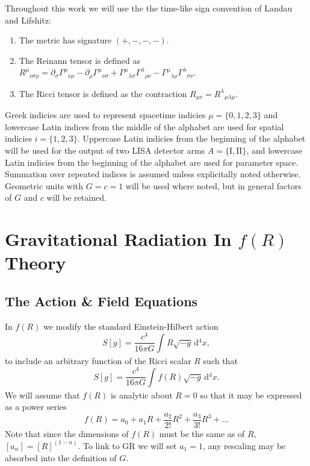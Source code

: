 \documentclass[a4paper, 11pt, titlepage, twoside]{report}
\newcommand{\dd}{\ensuremath{\mathrm{d}}}
\newcommand{\intd}[4]{\ensuremath{\int_{#1}^{#2}{#3}\,\dd{#4}}}
\begin{document}
Throughout this work we will use the the time-like sign convention of Landau and Lifshitz\cite{Landau1975}:
\begin{enumerate}
\item The metric has signature $(+,-,-,-)$.
\item The Reinann tensor is defined as ${R^\mu}_{\nu\sigma\rho} = \partial_\sigma {\Gamma^\mu}_{\nu\rho} - \partial_\rho {\Gamma^\mu}_{\nu\sigma} + {\Gamma^\mu}_{\lambda\sigma}{\Gamma^\lambda}_{\rho\nu} - {\Gamma^\mu}_{\lambda\rho}{\Gamma^\lambda}_{\sigma\nu}$.
\item The Ricci tensor is defined as the contraction $R_{\mu\nu} = {R^\lambda}_{\mu\lambda\mu}$.
\end{enumerate}
Greek indicies are used to represent spacetime indicies $\mu = \{0,1,2,3\}$ and lowercase Latin indices from the middle of the alphabet are used for spatial indicies $i = \{1,2,3\}$. Uppercase Latin indicies from the beginning of the alphabet will be used for the output of two LISA detector arms $A = \{\mathrm{I}, \mathrm{II}\}$, and lowercase Latin indicies from the beginning of the alphabet are used for parameter space. Summation over repeated indices is assumed unless explicitally noted otherwise. Geometric units with $G = c = 1$ will be used where noted, but in general factors of $G$ and $c$ will be retained.

\chapter{Gravitational Radiation In $f(R)$ Theory}

\section{The Action \& Field Equations}

In $f(R)$ we modify the standard Einstein-Hilbert action
\begin{equation}
S[g] = \frac{c^4}{16\pi G}\intd{}{}{R\sqrt{-g}}{^4x},
\end{equation}
to include an arbitrary function of the Ricci scalar $R$ such that
\begin{equation}
S[g] = \frac{c^4}{16\pi G}\intd{}{}{f(R)\sqrt{-g}}{^4x}.
\end{equation}
We will assume that $f(R)$ is analytic about $R = 0$ so that it may be expressed as a power series
\begin{equation}
f(R) = a_0 + a_1 R + \frac{a_2}{2!}R^2 + \frac{a_3}{3!}R^3 + \ldots
\end{equation}
Note that since the dimensions of $f(R)$ must be the same as of $R$, $[a_n] = [R]^{(1-n)}$. To link to GR we will set $a_1 = 1$, any rescaling may be absorbed into the definition of $G$.
\end{document}
